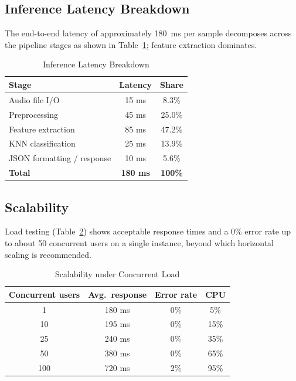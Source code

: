 \documentclass[oneside,a4paper,12pt]{report}
\begin{document}
\subsection{Inference Latency Breakdown}
The end-to-end latency of approximately 180~ms per sample decomposes across the
pipeline stages as shown in Table~\ref{tab:latency}; feature extraction dominates.

\begin{table}[H]
\centering
\caption{Inference Latency Breakdown}
\label{tab:latency}
\def\arraystretch{1.2}
\begin{tabular}{|l|c|c|}
\hline
\textbf{Stage} & \textbf{Latency} & \textbf{Share} \\ \hline
Audio file I/O & 15 ms & 8.3\% \\ \hline
Preprocessing & 45 ms & 25.0\% \\ \hline
Feature extraction & 85 ms & 47.2\% \\ \hline
KNN classification & 25 ms & 13.9\% \\ \hline
JSON formatting / response & 10 ms & 5.6\% \\ \hline
\textbf{Total} & \textbf{180 ms} & \textbf{100\%} \\ \hline
\end{tabular}
\end{table}

\subsection{Scalability}
Load testing (Table~\ref{tab:scale}) shows acceptable response times and a 0\%
error rate up to about 50 concurrent users on a single instance, beyond which
horizontal scaling is recommended.

\begin{table}[H]
\centering
\caption{Scalability under Concurrent Load}
\label{tab:scale}
\def\arraystretch{1.2}
\begin{tabular}{|c|c|c|c|}
\hline
\textbf{Concurrent users} & \textbf{Avg.\ response} & \textbf{Error rate} & \textbf{CPU} \\ \hline
1 & 180 ms & 0\% & 5\% \\ \hline
10 & 195 ms & 0\% & 15\% \\ \hline
25 & 240 ms & 0\% & 35\% \\ \hline
50 & 380 ms & 0\% & 65\% \\ \hline
100 & 720 ms & 2\% & 95\% \\ \hline
\end{tabular}
\end{table}
\end{document}

